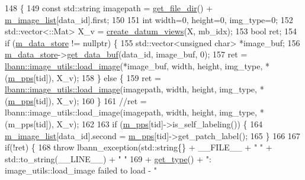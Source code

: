 \begin{DoxyCode}
148                                                                                   \{
149   \textcolor{keyword}{const} std::string imagepath = \hyperlink{classlbann_1_1generic__data__reader_ab4c6c2d4ba40ece809ce896828c8ff03}{get\_file\_dir}() + \hyperlink{classlbann_1_1image__data__reader_ae3fc949bd08c45ceafb1a03503261008}{m\_image\_list}[data\_id].first;
150 
151   \textcolor{keywordtype}{int} width=0, height=0, img\_type=0;
152   std::vector<::Mat> X\_v = \hyperlink{classlbann_1_1imagenet__reader__patches_a920f235bde95d5c3e8ae97c389c9d953}{create\_datum\_views}(X, mb\_idx);
153   \textcolor{keywordtype}{bool} ret;
154   \textcolor{keywordflow}{if} (\hyperlink{classlbann_1_1generic__data__reader_aefc076b842933a882214f4f709ca49c9}{m\_data\_store} != \textcolor{keyword}{nullptr}) \{
155     std::vector<unsigned char> *image\_buf;
156     \hyperlink{classlbann_1_1generic__data__reader_aefc076b842933a882214f4f709ca49c9}{m\_data\_store}->\hyperlink{classlbann_1_1generic__data__store_a2abb3d0327b528d36e23fcef9b937798}{get\_data\_buf}(data\_id, image\_buf, 0);
157     ret = \hyperlink{classlbann_1_1image__utils_ac324a04f877601387cfb10750f1f6b8d}{lbann::image\_utils::load\_image}(*image\_buf, width, height, img\_type,
       *(\hyperlink{classlbann_1_1imagenet__reader__patches_a76a4c760b0430ce6df990b9e3bd33fef}{m\_pps}[tid]), X\_v);
158   \} \textcolor{keywordflow}{else} \{
159     ret = \hyperlink{classlbann_1_1image__utils_ac324a04f877601387cfb10750f1f6b8d}{lbann::image\_utils::load\_image}(imagepath, width, height, img\_type, 
      *(\hyperlink{classlbann_1_1imagenet__reader__patches_a76a4c760b0430ce6df990b9e3bd33fef}{m\_pps}[tid]), X\_v);
160   \}
161     \textcolor{comment}{//ret = lbann::image\_utils::load\_image(imagepath, width, height, img\_type, *(m\_pps[tid]), X\_v);}
162 
163   \textcolor{keywordflow}{if} (\hyperlink{classlbann_1_1imagenet__reader__patches_a76a4c760b0430ce6df990b9e3bd33fef}{m\_pps}[tid]->is\_self\_labeling()) \{
164     \hyperlink{classlbann_1_1image__data__reader_ae3fc949bd08c45ceafb1a03503261008}{m\_image\_list}[data\_id].second = \hyperlink{classlbann_1_1imagenet__reader__patches_a76a4c760b0430ce6df990b9e3bd33fef}{m\_pps}[tid]->get\_patch\_label();
165   \}
166 
167   \textcolor{keywordflow}{if}(!ret) \{
168     \textcolor{keywordflow}{throw} lbann\_exception(std::string\{\} + \_\_FILE\_\_ + \textcolor{stringliteral}{" "} + std::to\_string(\_\_LINE\_\_) + \textcolor{stringliteral}{" "}
169                           + \hyperlink{classlbann_1_1imagenet__reader__patches_adc6363b20f058260c674d92af2a6ef80}{get\_type}() + \textcolor{stringliteral}{": image\_utils::load\_image failed to load - "}

\end{DoxyCode}
